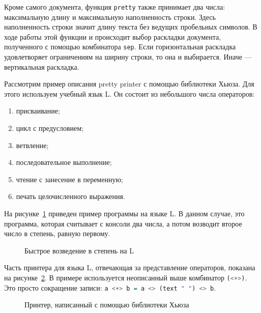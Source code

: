 

Кроме самого документа, функция \lstinline[language=Haskell]{pretty} также принимает два числа: максимальную длину и максимальную наполненность строки. Здесь наполненность строки значит длину текста без ведущих пробельных символов. В ходе работы этой функции и происходит выбор раскладки документа, полученного с помощью комбинатора \lstinline[language=Haskell]{sep}. Если горизонтальная раскладка удовлетворяет ограничениям на ширину строки, то она и выбирается. Иначе ---вертикальная раскладка.



Рассмотрим пример описания pretty printer с помощью библиотеки Хьюза. Для этого используем учебный язык L. Он состоит из небольшого числа операторов:
\begin{enumerate}
	\item присваивание;
	\item цикл с предусловием;
	\item ветвление;
	\item последовательное выполнение;
	\item чтение с занесение в переменную;
	\item печать целочисленного выражения.
\end{enumerate}

На рисунке~\ref{fig:lEx} приведен пример программы на языке L. В данном случае, это программа, которая считывает с консоли два числа, а потом возводит второе число в степень, равную первому.

\begin{figure}[h!]
	\centering
	
	\caption{Быстрое возведение в степень на L}
	\label{fig:lEx}
\end{figure}

Часть принтера для языка L, отвечающая за представление операторов, показана на рисунке~\ref{fig:lHughesPrinter}.
В примере используется неописанный выше комбинатор \lstinline[language=Haskell]{(<+>)}. Это просто сокращение записи: \lstinline[language=Haskell]{a <+> b = a <> (text " ") <> b}.
\begin{figure}[h!]
	
	\caption{Принтер, написанный с помощью библиотеки Хьюза}
	\label{fig:lHughesPrinter}
\end{figure}

